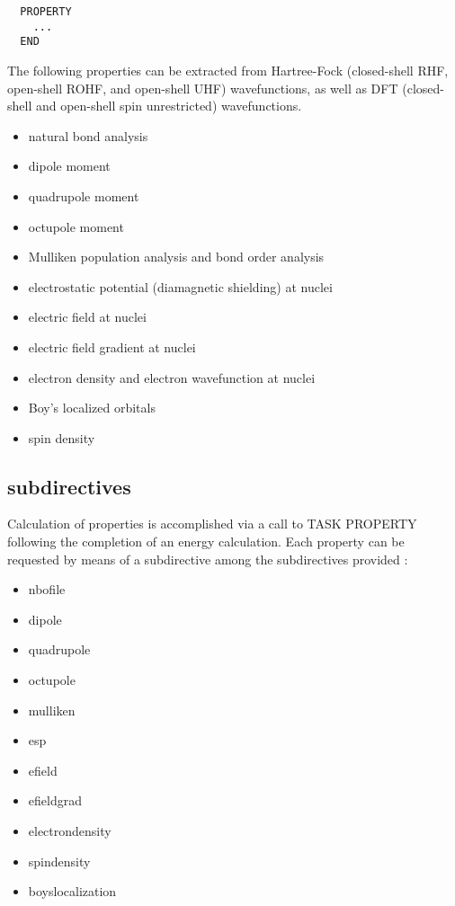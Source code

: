 \label{sec:property}
\begin{verbatim}
  PROPERTY
    ...
  END
\end{verbatim}

The following properties can be extracted from 
Hartree-Fock (closed-shell RHF, open-shell ROHF,
and open-shell UHF) wavefunctions, as well as
DFT (closed-shell and open-shell spin unrestricted)
wavefunctions.

\begin{itemize}
\item natural bond analysis
\item dipole moment
\item quadrupole moment
\item octupole moment
\item Mulliken population analysis and bond order analysis
\item electrostatic potential (diamagnetic shielding) at nuclei 
\item electric field at nuclei 
\item electric field gradient at nuclei 
\item electron density and electron wavefunction at nuclei 
\item Boy's localized orbitals
\item spin density
\end{itemize}

\subsection{subdirectives}

Calculation of properties is accomplished via a call to
TASK PROPERTY following the completion of an energy calculation.
Each property can be requested by means of a subdirective among
the subdirectives provided :

\begin{itemize}
\item nbofile
\item dipole
\item quadrupole
\item octupole
\item mulliken
\item esp
\item efield
\item efieldgrad
\item electrondensity
\item spindensity
\item boyslocalization
\end{itemize}


